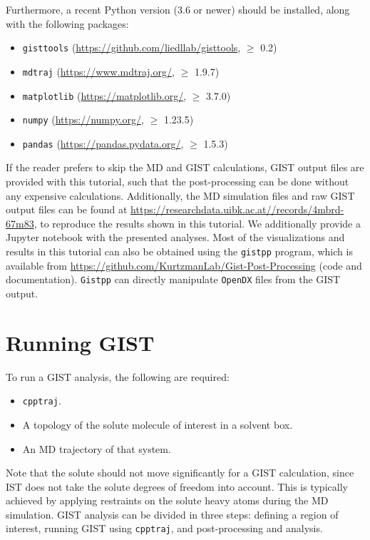 \documentclass[9pt,tutorial,pubversion]{livecoms}
\newcommand{\software}{\texttt}
\begin{document}
Furthermore, a recent Python version (3.6 or newer) should be installed, along with the following packages:
\begin{itemize}
	\item \software{gisttools} (\url{https://github.com/liedllab/gisttools}, $\geq$ 0.2)
	\item \software{mdtraj} (\url{https://www.mdtraj.org/}, $\geq$ 1.9.7) \cite{McGibbon2015-mdtraj}
	\item \software{matplotlib} (\url{https://matplotlib.org/}, $\geq$ 3.7.0) \cite{Hunter2007-matplotlib}
	\item \software{numpy} (\url{https://numpy.org/}, $\geq$ 1.23.5) \cite{harris2020-numpy}
	\item \software{pandas} (\url{https://pandas.pydata.org/}, $\geq$ 1.5.3) \cite{pandas-2023_8239932,mckinney-proc-scipy-2010}
\end{itemize}
If the reader prefers to skip the MD and GIST calculations, GIST output files are provided with this tutorial, such that the post-processing can be done without any expensive calculations.
Additionally, the MD simulation files and raw GIST output files can be found at \url{https://researchdata.uibk.ac.at//records/4mbrd-67m83}, to reproduce the results shown in this tutorial.
We additionally provide a Jupyter notebook \cite{Kluyver2016-jupyter,Granger2021-jupyter} with the presented analyses. 
Most of the visualizations and results in this tutorial can also be obtained using the \software{gistpp} program, which is available from \url{https://github.com/KurtzmanLab/Gist-Post-Processing} (code and documentation).
\software{Gistpp} can directly manipulate \software{OpenDX} files from the GIST output. 
\pagebreak %
\section{Running GIST}
\label{sec:running_GIST}
To run a GIST analysis, the following are required:
\begin{itemize}
	\item \software{cpptraj}.
	\item A topology of the solute molecule of interest in a solvent box.
	\item An MD trajectory of that system.
\end{itemize}
Note that the solute should not move significantly for a GIST calculation, since IST does not take the solute degrees of freedom into account.
This is typically achieved by applying restraints on the solute heavy atoms during the MD simulation.
GIST analysis can be divided in three steps: defining a region of interest, running GIST using \software{cpptraj}, and post-processing and analysis.
\cite{Ramsey2016}
\end{document}
